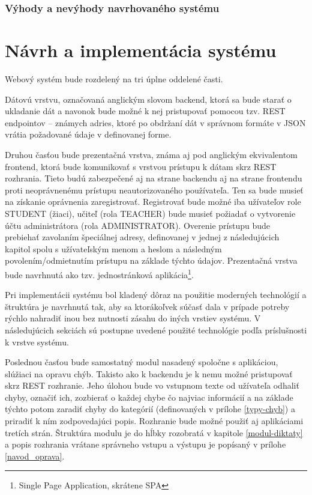 \documentclass[12pt,oneside]{fithesis2}
\begin{document}
       		\subsection{Výhody a nevýhody navrhovaného systému}
    \chapter{Návrh a implementácia systému}
    
    \par Webový systém bude rozdelený na tri úplne oddelené časti.

\par Dátovú vrstvu, označovaná anglickým slovom backend, ktorá sa bude starať o ukladanie dát a navonok bude možné k nej pristupovať pomocou tzv. REST endpointov – známych adries, ktoré po obdržaní dát v správnom formáte v JSON vrátia požadované údaje v definovanej forme.
	\par Druhou časťou bude prezentačná vrstva, známa aj pod anglickým ekvivalentom frontend, ktorá bude komunikovať s vrstvou prístupu k dátam skrz REST rozhrania. Tieto budú zabezpečené aj na strane backendu aj na strane frontendu proti neoprávnenému prístupu neautorizovaného používateľa. Ten sa bude musieť na získanie oprávnenia zaregistrovať. Registrovať bude možné iba užívateľov role STUDENT (žiaci), učiteľ (rola TEACHER) bude musieť požiadať o vytvorenie účtu administrátora (rola ADMINISTRATOR). Overenie prístupu bude prebiehať zavolaním špeciálnej adresy, definovanej v jednej z následujúcich kapitol spolu s užívateľským menom a heslom a následným povolením/odmietnutím prístupu na základe týchto údajov. Prezentačná vrstva bude navrhnutá ako tzv. jednostránková aplikácia\footnote{Single Page Application, skrátene SPA}.
	    \par Pri implementácii systému bol kladený dôraz na použitie moderných technológií a štruktúra je navrhnutá tak, aby sa ktorákoľvek súčasť dala v prípade potreby rýchlo nahradiť inou bez nutnosti zásahu do iných vrstiev systému. V následujúcich sekciách sú postupne uvedené použité technológie podľa príslušnosti k vrstve systému.
	    \par Poslednou časťou bude samostatný modul nasadený spoločne s aplikáciou, slúžiaci na opravu chýb. Takisto ako k backendu je k nemu možné pristupovať skrz REST rozhranie. Jeho úlohou bude vo vstupnom texte od užívateľa odhaliť chyby, označiť ich, zozbierať o každej chybe čo najviac informácií a na základe týchto potom zaradiť chyby do kategórií (definovaných v prílohe \ref{typy-chyb}) a priradiť k ním zodpovedajúci popis. Rozhranie bude možné použiť aj aplikáciami tretích strán. Štruktúra modulu je do hĺbky rozobratá v kapitole \ref{modul-diktaty} a popis rozhrania vrátane správneho vstupu a výstupu je popísaný v prílohe \ref{navod_oprava}.
	    
\end{document}
